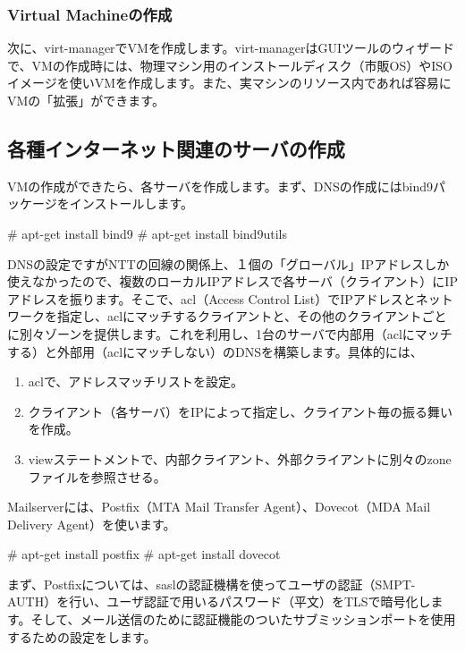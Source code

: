 \documentclass[mingoth,a4paper]{jsarticle}
\begin{document}
\subsubsection{Virtual Machineの作成}
次に、virt-managerでVMを作成します。virt-managerはGUIツールのウィザードで、VMの作成時には、物理マシン用のインストールディスク（市販OS）やISOイメージを使いVMを作成します。また、実マシンのリソース内であれば容易にVMの「拡張」ができます。

\clearpage

\subsection{各種インターネット関連のサーバの作成}
VMの作成ができたら、各サーバを作成します。まず、DNSの作成にはbind9パッケージをインストールします。
\begin{commandline}
# apt-get install bind9
# apt-get install bind9utils
\end{commandline}
DNSの設定ですがNTTの回線の関係上、１個の「グローバル」IPアドレスしか使えなかったので、複数のローカルIPアドレスで各サーバ（クライアント）にIPアドレスを振ります。そこで、acl（Access Control List）でIPアドレスとネットワークを指定し、aclにマッチするクライアントと、その他のクライアントごとに別々ゾーンを提供します。これを利用し、1台のサーバで内部用（aclにマッチする）と外部用（aclにマッチしない）のDNSを構築します。具体的には、
\begin{enumerate}
\item aclで、アドレスマッチリストを設定。
\item クライアント（各サーバ）をIPによって指定し、クライアント毎の振る舞いを作成。
\item viewステートメントで、内部クライアント、外部クライアントに別々のzoneファイルを参照させる。
\end{enumerate}
Mailserverには、Postfix（MTA Mail Transfer Agent）、Dovecot（MDA Mail Delivery Agent）を使います。
\begin{commandline}
# apt-get install postfix
# apt-get install dovecot
\end{commandline}
まず、Postfixについては、saslの認証機構を使ってユーザの認証（SMPT-AUTH）を行い、ユーザ認証で用いるパスワード（平文）をTLSで暗号化します。そして、メール送信のために認証機能のついたサブミッションポートを使用するための設定をします。
\end{document}
